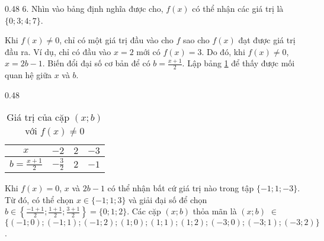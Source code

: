 {
   \begin{minipageindent}{0.48\textwidth}
      6. Nhìn vào bảng định nghĩa được cho, $f(x)$ có thể nhận các giá trị là $\{0; 3; 4; 7\}$.

      Khi $f(x) \neq 0$, chỉ có một giá trị đầu vào cho $f$ sao cho $f(x)$ đạt được giá trị đầu ra. Ví dụ, chỉ có đầu vào $x = 2$ mới có $f(x) = 3$. Do đó, khi $f(x) \neq 0$, $x = 2b-1$. Biến đổi đại số cơ bản để có $b = \frac{x + 1}{2}$. Lập bảng \ref{tab:ham_so_mot_bien:dinh_nghia:b_values7} để thấy được mối quan hệ giữa $x$ và $b$.

   \end{minipageindent}
   \hfill
   \begin{minipageindent}{0.48\textwidth}
      \begin{table}[H]
         \centering
         \begin{tabular}{|c|c|c|c|}
            \hline
            $x$ & $-2$ & $2$ & $-3$\\
            \hline
            $b = \frac{x+1}{2}$ & $-\frac{3}{2}$ & $2$ & $-1$\\
            \hline
         \end{tabular}
         \caption{Giá trị của cặp $(x; b)$ với $f(x) \neq 0$}
         \label{tab:ham_so_mot_bien:dinh_nghia:b_values7}
      \end{table}
   \end{minipageindent}
}

Khi $f(x) = 0$, $x$ và $2b-1$ có thể nhận bất cứ giá trị nào trong tập $\{-1; 1; -3\}$. Từ đó, có thể chọn $x \in \{-1; 1; 3\}$ và giải đại số để chọn $b \in \left\{\frac{-1+1}{2}; \frac{1+1}{2}; \frac{3+1}{2}\right\} = \{0; 1; 2\}$. Các cặp $(x; b)$ thỏa mãn là $(x; b)$ $\in$ $\{\left(-1; 0\right); \left(-1; 1\right); \left(-1; 2\right); \left(1; 0\right); \left(1; 1\right); \left(1; 2\right); \left(-3; 0\right); \left(-3; 1\right); \left(-3; 2\right)\}$.

